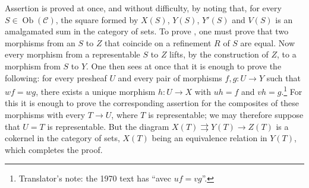 Assertion  is proved at once, and  without difficulty, by
noting that, for every \(S\in\operatorname{Ob}(\mathscr C)\), the square formed
by \(X(S)\), \(Y(S)\), \(Y'(S)\) and \(V(S)\) is an amalgamated sum in the
category of sets. To prove , one must prove that two morphisms from an
\(S\) to \(Z\) that coincide on a refinement \(R\) of \(S\) are equal. Now every
morphism from a representable \(S\) to \(Z\) lifts, by the construction of
\(Z\), to a morphism from \(S\) to \(Y\). One then sees at once that it is
enough to prove the following: for every presheaf \(U\) and every pair of
morphisms \(f,g:U\to Y\) such that \(wf=wg\), there exists a unique morphism
\(h:U\to X\) with \(uh=f\) and \(vh=g\).\footnote{Translator's note: the 1970 text has ``avec \(uf=vg\)''.} For this it is enough to prove the
corresponding assertion for the composites of these morphisms with every
\(T\to U\), where \(T\) is representable; we may therefore suppose that
\(U=T\) is representable. But the diagram
\(X(T)\rightrightarrows Y(T)\to Z(T)\) is a cokernel in the category of sets,
\(X(T)\) being an equivalence relation in \(Y(T)\), which completes the proof.

